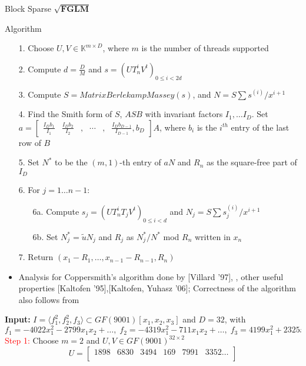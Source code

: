 \documentclass[final]{beamer}
\newlength{\twocolwid}
\begin{document}
\begin{frame}[t]
\begin{columns}[t]
\begin{column}{\twocolwid}
\begin{block}{Block Sparse $\mathbf{\sqrt{FGLM}}$}
	\begin{alertblock}{Algorithm}
		\begin{itemize}
			\item[1.] Choose $U,V \in \mathbb{K}^{m \times D}$, where $m$ is the number of threads supported
			\item[2.] Compute $d = \frac{D}{M}$ and
			$s = (UT_n^iV^t)_{0 \le i < 2d}$
			\item[3.] Compute
			 $S = MatrixBerlekampMassey(s)$,
			and $N = S\sum s^{(i)}/x^{i+1}$
			\item[4.] Find the Smith form of $S$, $ASB$ with invariant factors $I_1,\dots I_D$. Set $a = \begin{bmatrix}
			\frac{I_Db_1}{I_1} & \frac{I_Db_2}{I_2}&,&\cdots&,&\frac{I_Db_{D-1}}{I_{D-1}},b_D
			\end{bmatrix} A$, where $b_i$ is the $i^{th}$ entry of the last row of $B$
			\item[5.] Set $N^*$ to be the $(m,1)$-th entry of $aN$ and $R_n$ as the square-free part of $I_D$
			\item[6.] For $j = 1 \dots n-1$:
			\begin{itemize}
			\item[6a.] Compute $s_j = (UT_n^i T_j V^t)_{0 \le i < d}$ and $N_j = S\sum s_j^{(i)}/x^{i+1}$
			\item[6b.] Set $N^*_j = \tilde{u}N_j$ and $R_j$ as $N^*_j/N^*$ mod $R_n$ written in $x_n$
			\end{itemize}
			\item[7.] Return $(x_1-R_1, \dots, x_{n-1} - R_{n-1}, R_n)$
		\end{itemize}
	\end{alertblock}
	\begin{itemize}
	\item Analysis for Coppersmith's algorithm done by
	 [Villard '97], \cite{KaVi04}, other useful properties [Kaltofen '95],[Kaltofen, Yuhasz '06]; Correctness of the algorithm also follows from \cite{BoSaSc03}
	\end{itemize}
	\begin{example}
		\textbf{Input: }$I = \langle f_1^2, f_2^2,f_3 \rangle \subset GF(9001)[x_1,x_2,x_3]$
		and $D = 32$, with
		$$ f_1 = -4022x_1^2 - 2799x_1x_2 + \dots, \;
		   f_2 = -4319x_1^2 - 711x_1x_2 + \dots, \;
		   f_3 = 4199x_1^2 + 2325x_1x_2 + \dots$$
		\textcolor{red}{Step 1:} Choose $m = 2$ and $U,V \in GF(9001)^{32 \times 2}$ 
		$$ U = \begin{bmatrix}
		1898 &6830 &3494 & 169 &7991 &3352 \dots \\

\end{bmatrix}$$
\end{example}
\end{block}
\end{column}
\end{columns}
\end{frame}
\end{document}
